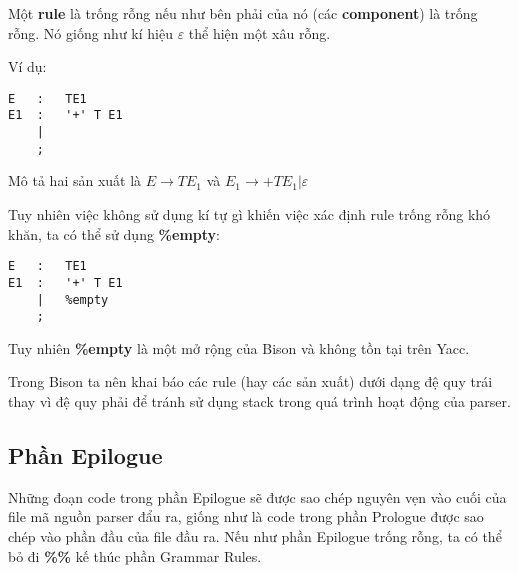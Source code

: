 \documentclass[../report.tex]{subfiles}
\begin{document}
Một \textbf{rule} là trống rỗng nếu như bên phải của nó (các 
\textbf{component}) là trống rỗng. 
\cite{empty-rules}
Nó giống như kí hiệu $\varepsilon$ thể hiện một xâu rỗng. 

Ví dụ:
\begin{lstlisting}
E   :   TE1
E1  :   '+' T E1
    | 
    ;
\end{lstlisting}
Mô tả hai sản xuất là 
$E \rightarrow TE_1$
và 
$E_1 \rightarrow +TE_1 | \varepsilon$

Tuy nhiên việc không sử dụng kí tự gì khiến việc xác định rule 
trống rỗng khó khăn, ta có thể sử dụng \textbf{\%empty}:
\begin{lstlisting}
E   :   TE1
E1  :   '+' T E1
    |   %empty
    ;
\end{lstlisting}
Tuy nhiên \textbf{\%empty} là một mở rộng của Bison và 
không tồn tại trên Yacc.

Trong Bison ta nên khai báo các rule (hay các sản xuất) dưới dạng 
đệ quy trái thay vì đệ quy phải để tránh sử dụng stack trong quá trình hoạt động của parser. \cite{left-recursion}

\subsection{Phần Epilogue}
Những đoạn code trong phần Epilogue sẽ được sao chép nguyên vẹn 
vào cuối của file mã nguồn parser đẩu ra, giống như là code trong
phần Prologue được sao chép vào phần đầu của file đầu ra. 
Nếu như phần Epilogue trống rỗng, ta có thể bỏ đi \textbf{\%\%} 
kế thúc phần Grammar Rules.
\end{document}

